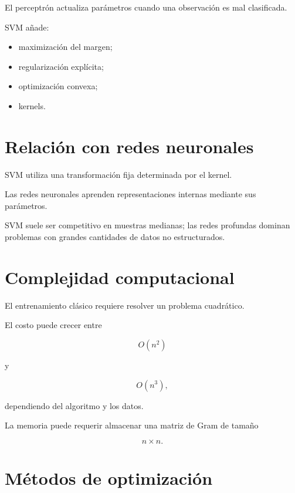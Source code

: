 \documentclass[
  spanish,
  10.5pt,
  letterpaper,
  DIV=11,
  numbers=noendperiod,
  oneside,
  open=any]{scrreprt}
\providecommand{\tightlist}{%
  \setlength{\itemsep}{0pt}\setlength{\parskip}{0pt}}
\theoremstyle{definition}
\theoremstyle{definition}
\theoremstyle{plain}
\theoremstyle{remark}
\begin{document}

El perceptrón actualiza parámetros cuando una observación es mal
clasificada.

SVM añade:

\begin{itemize}
\tightlist
\item
  maximización del margen;
\item
  regularización explícita;
\item
  optimización convexa;
\item
  kernels.
\end{itemize}

\section*{Relación con redes
neuronales}\label{relaciuxf3n-con-redes-neuronales-3}


SVM utiliza una transformación fija determinada por el kernel.

Las redes neuronales aprenden representaciones internas mediante sus
parámetros.

SVM suele ser competitivo en muestras medianas; las redes profundas
dominan problemas con grandes cantidades de datos no estructurados.

\section*{Complejidad computacional}\label{complejidad-computacional-2}


El entrenamiento clásico requiere resolver un problema cuadrático.

El costo puede crecer entre

\[
O(n^2)
\]

y

\[
O(n^3),
\]

dependiendo del algoritmo y los datos.

La memoria puede requerir almacenar una matriz de Gram de tamaño

\[
n\times n.
\]

\section*{Métodos de optimización}\label{muxe9todos-de-optimizaciuxf3n}
\end{document}
